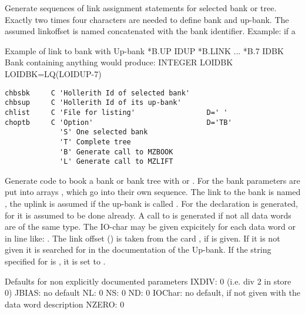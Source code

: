 Generate sequences of link assignment statements for selected
bank or tree.
Exactly two times four characters are needed to define bank and up-bank.
The assumed linkoffset is named  concatenated with the
bank identifier.
Example: if a 
\par
\begin{XMPt}{Example of link to bank  with Up-bank }
         *B.UP IDUP
         *B.LINK
         ...
         *B.7  IDBK  Bank containing anything
 {\rm would produce:}
         INTEGER LOIDBK
         LOIDBK=LQ(LOIDUP-7)
\end{XMPt}
 
 
\begin{verbatim}
chbsbk     C 'Hollerith Id of selected bank'
chbsup     C 'Hollerith Id of its up-bank'
chlist     C 'File for listing'                 D=' '
choptb     C 'Option'                           D='TB'
             'S' One selected bank
             'T' Complete tree
             'B' Generate call to MZBOOK
             'L' Generate call to MZLIFT
\end{verbatim}
 
Generate code to book a bank or bank tree with 
or .
For  the bank parameters are put into arrays
, which go into their own  sequence.
The link to the bank  is named , 
the uplink is assumed  if the up-bank is called .
For  the declaration  is generated, 
for  it is assumed to be done already. 
A call to  is generated if not all data
words are of the same type. The IO-char may be given expicitely for
each data word or in line like: .
The link offset () is taken from the card , 
if  is given. 
If it is not given it is searched for in the documentation of the Up-bank. 
If the string specified for  is ,
it is set to .
 
\begin{XMPt}{Defaults for non explicitly documented parameters}
  IXDIV:  0 (i.e. div 2 in store 0)
  JBIAS:  no default
  NL:     0
  NS:     0
  ND:     0
  IOChar: no default, if not given with the data word description
  NZERO:  0
\end{XMPt}
 
 
